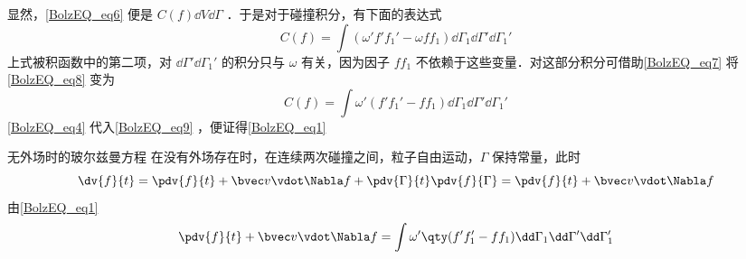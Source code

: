 显然，\autoref{BolzEQ_eq6} 便是 $C(f)\dd V\dd\Gamma$ ．于是对于碰撞积分，有下面的表达式
\begin{equation}\label{BolzEQ_eq8}
C(f)=\int(\omega'f'f_1'-\omega f f_1)\dd\Gamma_1\dd\Gamma'\dd\Gamma_1'
\end{equation}
上式被积函数中的第二项，对 $\dd\Gamma'\dd\Gamma_1'$ 的积分只与 $\omega$ 有关，因为因子 $ff_1$ 不依赖于这些变量．对这部分积分可借助\autoref{BolzEQ_eq7} 将\autoref{BolzEQ_eq8} 变为
\begin{equation}\label{BolzEQ_eq9}
C(f)=\int\omega'(f'f_1'- f f_1)\dd\Gamma_1\dd\Gamma'\dd\Gamma_1'
\end{equation}
\autoref{BolzEQ_eq4} 代入\autoref{BolzEQ_eq9} ，便证得\autoref{BolzEQ_eq1} 
\begin{example}{无外场时的玻尔兹曼方程}
在没有外场存在时，在连续两次碰撞之间，粒子自由运动，$\Gamma$ 保持常量，此时
\begin{equation}
\dv{f}{t}=\pdv{f}{t}+\bvec v\vdot \Nabla f+\pdv{\Gamma}{t}\pdv{f}{\Gamma}=\pdv{f}{t}+\bvec v\vdot \Nabla f
\end{equation}
由\autoref{BolzEQ_eq1} 
\begin{equation}
\pdv{f}{t}+\bvec v\vdot \Nabla f=\int\omega'\qty(f'f_1'-ff_1)\dd\Gamma_1\dd\Gamma'\dd\Gamma_1'
\end{equation}
\end{example}
